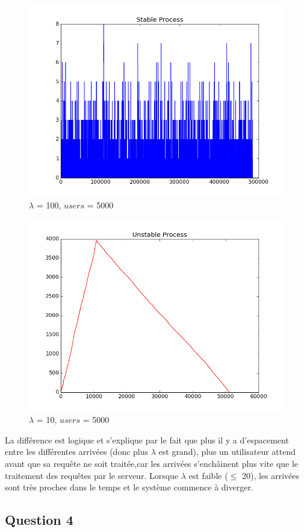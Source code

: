 \documentclass[12pt]{article}
\begin{document}
\begin{figure}[H]
\centering
\includegraphics[scale=0.50]{stableprocessquestion3.png}
\caption{\label{fig:rf_taille_noeud} $\lambda$ = 100, $users$ = 5000}
\end{figure}

\begin{figure}[H]
\centering
\includegraphics[scale=0.50]{unstableprocessquestion3.png}
\caption{\label{fig:rf_taille_noeud} $\lambda$ = 10, $users$ = 5000}
\end{figure}

La différence est logique et s'explique par le fait que plus il y a d'espacement entre les différentes arrivées (donc plus $\lambda$ est grand), plus un utilisateur attend avant que sa requête ne soit traitée,car les arrivées s'enchâinent plus vite que le traitement des requêtes par le serveur. Lorsque $\lambda$ est faible ($\leq$ 20), les arrivées sont très proches dans le temps et le système commence à diverger.

\subsection{Question 4}




 
\end{document}

